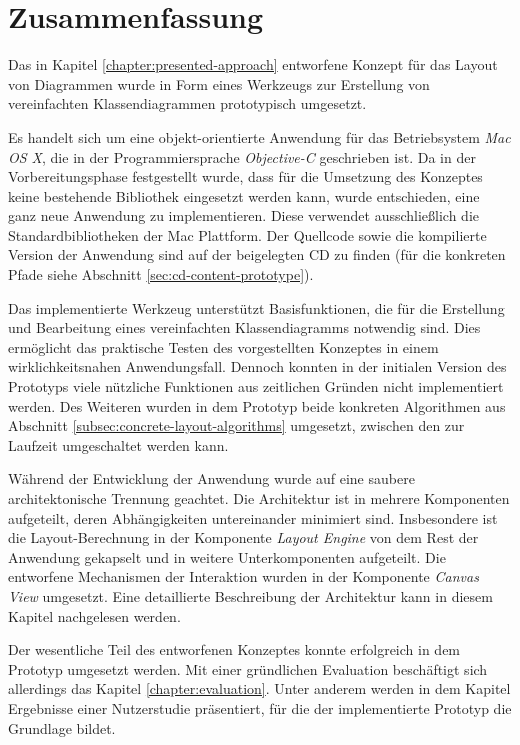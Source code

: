 \section{Zusammenfassung}
\label{sec:prototype-summary}

Das in Kapitel \ref{chapter:presented-approach} entworfene Konzept für das Layout von Diagrammen wurde in Form eines Werkzeugs zur Erstellung von vereinfachten Klassendiagrammen prototypisch umgesetzt.

Es handelt sich um eine objekt-orientierte Anwendung für das Betriebsystem \textit{Mac OS X}, die in der Programmiersprache \textit{Objective-C} geschrieben ist. Da in der Vorbereitungsphase festgestellt wurde, dass für die Umsetzung des Konzeptes keine bestehende Bibliothek eingesetzt werden kann, wurde entschieden, eine ganz neue Anwendung zu implementieren. Diese verwendet ausschließlich die Standardbibliotheken der Mac Plattform. Der Quellcode sowie die kompilierte Version der Anwendung sind auf der beigelegten CD zu finden (für die konkreten Pfade siehe Abschnitt \ref{sec:cd-content-prototype}).

Das implementierte Werkzeug unterstützt Basisfunktionen, die für die Erstellung und Bearbeitung eines vereinfachten Klassendiagramms notwendig sind. Dies ermöglicht das praktische Testen des vorgestellten Konzeptes in einem wirklichkeitsnahen Anwendungsfall. Dennoch konnten in der initialen Version des Prototyps viele nützliche Funktionen aus zeitlichen Gründen nicht implementiert werden. Des Weiteren wurden in dem Prototyp beide konkreten Algorithmen aus Abschnitt \ref{subsec:concrete-layout-algorithms} umgesetzt, zwischen den zur Laufzeit umgeschaltet werden kann.

Während der Entwicklung der Anwendung wurde auf eine saubere architektonische Trennung geachtet. Die Architektur ist in mehrere Komponenten aufgeteilt, deren Abhängigkeiten untereinander minimiert sind. Insbesondere ist die Layout-Berechnung in der Komponente \textit{Layout Engine} von dem Rest der Anwendung gekapselt und in weitere Unterkomponenten aufgeteilt. Die entworfene Mechanismen der Interaktion wurden in der Komponente \textit{Canvas View} umgesetzt. Eine detaillierte Beschreibung der Architektur kann in diesem Kapitel nachgelesen werden.

Der wesentliche Teil des entworfenen Konzeptes konnte erfolgreich in dem Prototyp umgesetzt werden. Mit einer gründlichen Evaluation beschäftigt sich allerdings das Kapitel \ref{chapter:evaluation}. Unter anderem werden in dem Kapitel Ergebnisse einer Nutzerstudie präsentiert, für die der implementierte Prototyp die Grundlage bildet.

